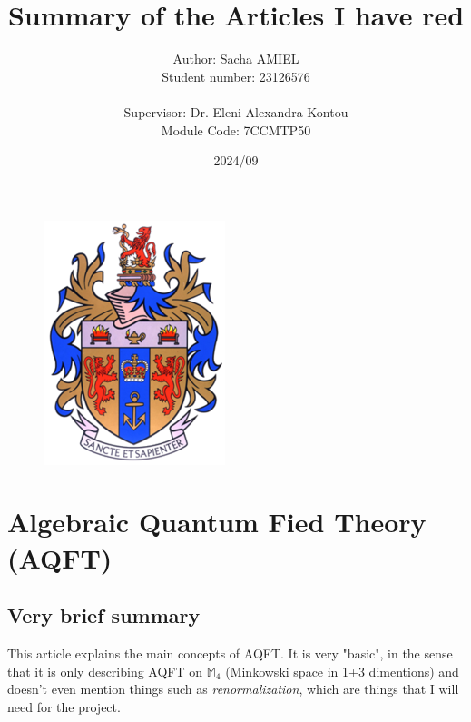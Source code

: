 \documentclass[a4paper,11pt]{article}
\title{Summary of the Articles I have red}
\author{Author: Sacha AMIEL \\
Student number: 23126576\\
\\ Supervisor: Dr. Eleni-Alexandra Kontou \\ Module Code: 7CCMTP50}
\date{2024/09}
\numberwithin{equation}{section}
\theoremstyle{definition}
\begin{document}
\clearpage\maketitle
\thispagestyle{empty}
\begin{figure}[H]
    \centering
    \vspace{100mm}
    \includegraphics[width=0.2\columnwidth]{Template/kcl_logo.png}
\end{figure}

\newpage

\tableofcontents

\newpage
\section{Algebraic Quantum Fied Theory (AQFT)}
\label{Sec:AQFT}
\subsection{Very brief summary}
This article \cite{AQFT_Intro} explains the main concepts of AQFT. It is very "basic", in the sense that it is only describing AQFT on $\mathbb{M}_4$ (Minkowski space in 1+3 dimentions) and doesn't even mention things such as \emph{renormalization}, which are things that I will need for the project.
\end{document}
